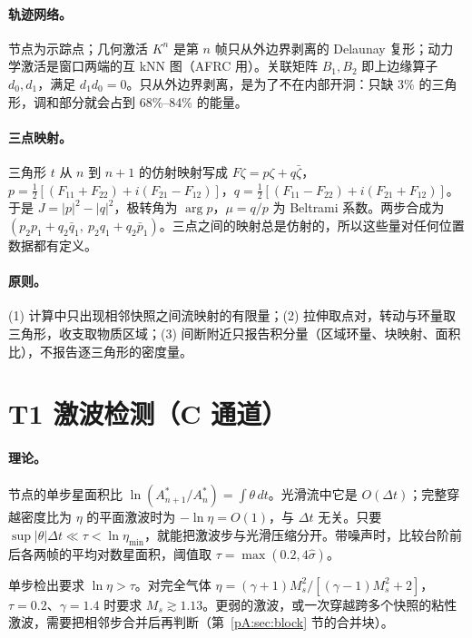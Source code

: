 \paragraph{轨迹网络。}节点为示踪点；几何激活 $K^n$ 是第 $n$ 帧只从外边界剥离的 Delaunay 复形；动力学激活是窗口两端的互 kNN 图（AFRC 用）。关联矩阵 $B_1,B_2$ 即上边缘算子 $d_0,d_1$，满足 $d_1d_0=0$。只从外边界剥离，是为了不在内部开洞：只缺 3\% 的三角形，调和部分就会占到 68\%–84\% 的能量。

\paragraph{三点映射。}三角形 $t$ 从 $n$ 到 $n+1$ 的仿射映射写成 $F\zeta=p\zeta+q\bar\zeta$，
$p=\tfrac12[(F_{11}+F_{22})+i(F_{21}-F_{12})]$，$q=\tfrac12[(F_{11}-F_{22})+i(F_{21}+F_{12})]$。于是 $J=|p|^2-|q|^2$，极转角为 $\arg p$，$\mu=q/p$ 为 Beltrami 系数。两步合成为 $(p_2p_1+q_2\bar q_1,\ p_2q_1+q_2\bar p_1)$。三点之间的映射总是仿射的，所以这些量对任何位置数据都有定义。

\paragraph{原则。}(1) 计算中只出现相邻快照之间流映射的有限量；(2) 拉伸取点对，转动与环量取三角形，收支取物质区域；(3) 间断附近只报告积分量（区域环量、块映射、面积比），不报告逐三角形的密度量。

\section{T1 激波检测（C 通道）}

\paragraph{理论。}节点的单步星面积比 $\ln(A^\ast_{n+1}/A^\ast_n)=\int\theta\,dt$。光滑流中它是 $O(\Delta t)$；完整穿越密度比为 $\eta$ 的平面激波时为 $-\ln\eta=O(1)$，与 $\Delta t$ 无关。只要 $\sup|\theta|\Delta t\ll\tau<\ln\eta_{\min}$，就能把激波步与光滑压缩分开。带噪声时，比较台阶前后各两帧的平均对数星面积，阈值取 $\tau=\max(0.2,4\hat\sigma)$。

\begin{proposition}[可检出的最弱激波]
单步检出要求 $\ln\eta>\tau$。对完全气体 $\eta=(\gamma+1)M_s^2/[(\gamma-1)M_s^2+2]$，$\tau=0.2$、$\gamma=1.4$ 时要求 $M_s\gtrsim1.13$。更弱的激波，或一次穿越跨多个快照的粘性激波，需要把相邻步合并后再判断（第~\ref{pA:sec:block} 节的合并块）。
\end{proposition}

